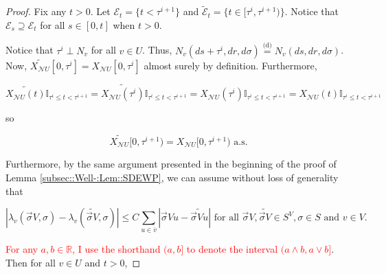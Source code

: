 \documentclass[12pt]{article}
\newcommand{\mb}{\mathbb}
\newcommand{\mc}{\mathcal}
\newcommand{\ov}{\overline}
\newcommand{\te}{\text}
\newcommand{\tr}{\textcolor{red}}
\newcommand{\ind}{\hspace{24pt}}
\newcommand{\deq}{\overset{\text{(d)}}{=}}			%
\newcommand{\neigh}{\mc{N}}					%
\renewcommand{\v}{v}							%
\newcommand{\vv}{u}								%
\renewcommand{\U}{U}							%
\renewcommand{\S}{S}							%
\newcommand{\s}{\sigma}							%
\newcommand{\sv}{\vec{\s}}						%
\renewcommand{\t}{t}							%
\newcommand{\cl}{\ov}							%
\newcommand{\poiss}[1]{N_{#1}}						%
\newcommand{\V}{V}									%
\renewcommand{\tt}{s}								%
\newcommand{\rt}[1]{\tau^{#1}}						%
\newcommand{\itt}{i}								%
\newcommand{\XState}[1]{\S^{#1}}				%
\newcommand{\rxvt}[2]{X_{#1}{(#2)}}					%
\newcommand{\rxvts}[2]{X_{#1}{#2}}					%
\newcommand{\rate}[1]{\lambda_{#1}}					%
\newcommand{\const}[1]{C_{#1}}						%
\newcommand{\alt}{\widetilde}						%
\newcommand{\evnt}{\mc{E}}						%
\begin{document}
\begin{proof}
\ind Fix any \(\t > 0\). Let \(\evnt_\t = \{\t < \rt{\itt+1}\}\) and \(\alt{\evnt}_\t = \{\t\in [\rt{\itt},\rt{\itt+1})\}\). Notice that \(\evnt_\tt \supseteq \evnt_\t\) for all \(\tt\in [0,\t]\) when \(\t > 0\). 

\ind Notice that \(\rt{\itt} \perp \poiss{\v}\) for all \(\v \in \U\). Thus, \(\poiss{\v}(d\tt+\rt{\itt},dr,d\s) \deq \poiss{\v}(d\tt,dr,d\s)\). Now, \(\alt{\rxvts{\neigh{\U}}{}}[0,\rt{\itt}] = \rxvts{\neigh{\U}}{[0,\rt{\itt}]}\) almost surely by definition. Furthermore,

\[\alt{\rxvt{\neigh{\U}}{\t}}\mb{I}_{\rt{\itt}\leq \t < \rt{\itt+1}} = \alt{\rxvt{\neigh{\U}}{\rt{\itt}}}\mb{I}_{\rt{\itt}\leq \t < \rt{\itt+1}} = \rxvt{\neigh{\U}}{\rt{\itt}}\mb{I}_{\rt{\itt}\leq \t < \rt{\itt+1}} = \rxvt{\neigh{\U}}{\t}\mb{I}_{\rt{\itt}\leq \t < \rt{\itt+1}}\]

so

\[\alt{\rxvts{\neigh{\U}}{}}[0,\rt{\itt+1}) = \rxvts{\neigh{\U}}{[0,\rt{\itt+1})} \te{ a.s.}\]

Furthermore, by the same argument presented in the beginning of the proof of Lemma \ref{subsec::Well-:Lem::SDEWP}, we can assume without loss of generality that 

\[|\rate{\v}(\sv{\V}{},\s) - \rate{\v}(\alt{\sv{\V}{}},\s)| \leq \const{}\sum_{\vv\in \cl{\v}} |\sv{\V}{\vv} - \alt{\sv{\V}{\vv}}|\te{ for all } \sv{\V}{},\alt{\sv{\V}{}}\in \S^\V,\s \in \S \te{ and } \v \in \V.\]

\tr{For any \(a,b\in \mb{R}\), I use the shorthand \((a,b]\) to denote the interval \((a\wedge b,a\vee b]\)}. Then for all \(v\in \U\) and \(\t > 0\),


\end{proof}
\end{document}
